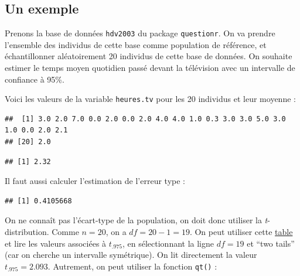 \documentclass[
  french,
]{book}
\newenvironment{Shaded}{\begin{snugshade}}{\end{snugshade}}
\newcommand{\DecValTok}[1]{\textcolor[rgb]{0.00,0.00,0.81}{#1}}
\newcommand{\FunctionTok}[1]{\textcolor[rgb]{0.00,0.00,0.00}{#1}}
\newcommand{\NormalTok}[1]{#1}
\newcommand{\SpecialCharTok}[1]{\textcolor[rgb]{0.00,0.00,0.00}{#1}}
\begin{document}
\hypertarget{un-exemple}{%
\subsection{Un exemple}\label{un-exemple}}

Prenons la base de données \texttt{hdv2003} du package \texttt{questionr}. On va prendre l'ensemble des individus de cette base comme population de référence, et échantillonner aléatoirement 20 individus de cette base de données. On souhaite estimer le temps moyen quotidien passé devant la télévision avec un intervalle de confiance à 95\%.

Voici les valeurs de la variable \texttt{heures.tv} pour les 20 individus et leur moyenne :

\begin{Shaded}
\end{Shaded}

\begin{verbatim}
##  [1] 3.0 2.0 7.0 0.0 2.0 0.0 2.0 4.0 4.0 1.0 0.3 3.0 3.0 5.0 3.0 1.0 0.0 2.0 2.1
## [20] 2.0
\end{verbatim}

\begin{Shaded}
\end{Shaded}

\begin{verbatim}
## [1] 2.32
\end{verbatim}

Il faut aussi calculer l'estimation de l'erreur type :

\begin{Shaded}
\end{Shaded}

\begin{verbatim}
## [1] 0.4105668
\end{verbatim}

On ne connaît pas l'écart-type de la population, on doit donc utiliser la \emph{t}-distribution. Comme \(n=20\), on a \(df = 20 - 1 = 19\). On peut utiliser cette \href{https://www.sjsu.edu/faculty/gerstman/StatPrimer/t-table.pdf}{table} et lire les valeurs associées à \(t_{.975}\), en sélectionnant la ligne \(df = 19\) et ``two tails'' (car on cherche un intervalle symétrique). On lit directement la valeur \(t_{.975} = 2.093\). Autrement, on peut utiliser la fonction \texttt{qt()} :
\end{document}

